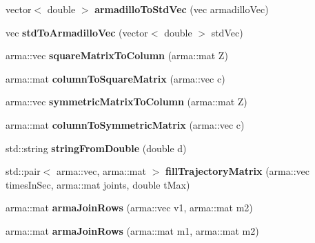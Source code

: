 \begin{DoxyCompactItemize}
\item 
vector$<$ double $>$ {\bfseries armadillo\+To\+Std\+Vec} (vec armadillo\+Vec)\hypertarget{namespacekukadu_aa526722c4b4af0fe1798ec3dc80c8ce5}{}\label{namespacekukadu_aa526722c4b4af0fe1798ec3dc80c8ce5}

\item 
vec {\bfseries std\+To\+Armadillo\+Vec} (vector$<$ double $>$ std\+Vec)\hypertarget{namespacekukadu_aa810194d5e61a8bfbf3d3b1e4aa405ef}{}\label{namespacekukadu_aa810194d5e61a8bfbf3d3b1e4aa405ef}

\item 
arma\+::vec {\bfseries square\+Matrix\+To\+Column} (arma\+::mat Z)\hypertarget{namespacekukadu_a66cd2d039457ad6fe13c55450ec6357d}{}\label{namespacekukadu_a66cd2d039457ad6fe13c55450ec6357d}

\item 
arma\+::mat {\bfseries column\+To\+Square\+Matrix} (arma\+::vec c)\hypertarget{namespacekukadu_a8d2e88a98c08cbfd87d18b1a3b4d1298}{}\label{namespacekukadu_a8d2e88a98c08cbfd87d18b1a3b4d1298}

\item 
arma\+::vec {\bfseries symmetric\+Matrix\+To\+Column} (arma\+::mat Z)\hypertarget{namespacekukadu_aca8d32e86c74fc56cbc550bd94f60d3d}{}\label{namespacekukadu_aca8d32e86c74fc56cbc550bd94f60d3d}

\item 
arma\+::mat {\bfseries column\+To\+Symmetric\+Matrix} (arma\+::vec c)\hypertarget{namespacekukadu_a32697d90452b54037e5a425ba1ced6ff}{}\label{namespacekukadu_a32697d90452b54037e5a425ba1ced6ff}

\item 
std\+::string {\bfseries string\+From\+Double} (double d)\hypertarget{namespacekukadu_af021770f184a52bcf84ff0941df261b9}{}\label{namespacekukadu_af021770f184a52bcf84ff0941df261b9}

\item 
std\+::pair$<$ arma\+::vec, arma\+::mat $>$ {\bfseries fill\+Trajectory\+Matrix} (arma\+::vec times\+In\+Sec, arma\+::mat joints, double t\+Max)\hypertarget{namespacekukadu_ad8e305f3bc9c80ca98a359e8a49426d8}{}\label{namespacekukadu_ad8e305f3bc9c80ca98a359e8a49426d8}

\item 
arma\+::mat {\bfseries arma\+Join\+Rows} (arma\+::vec v1, arma\+::mat m2)\hypertarget{namespacekukadu_adfb0b5a62a292323b452e90d071da4ea}{}\label{namespacekukadu_adfb0b5a62a292323b452e90d071da4ea}

\item 
arma\+::mat {\bfseries arma\+Join\+Rows} (arma\+::mat m1, arma\+::mat m2)\hypertarget{namespacekukadu_a3fc360dd62f44f1ed05b93719cf25e51}{}\label{namespacekukadu_a3fc360dd62f44f1ed05b93719cf25e51}


\end{DoxyCompactItemize}
